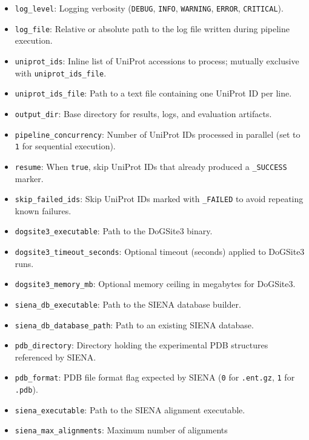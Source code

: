 \documentclass[11pt]{article}
\begin{document}
\begin{itemize}[noitemsep,leftmargin=*,labelsep=0.5em]
      \item \texttt{log\_level}: Logging verbosity (\texttt{DEBUG}, \texttt{INFO},
            \texttt{WARNING}, \texttt{ERROR}, \texttt{CRITICAL}).
      \item \texttt{log\_file}: Relative or absolute path to the log file written
            during pipeline execution.
      \item \texttt{uniprot\_ids}: Inline list of UniProt accessions to process;
            mutually exclusive with \texttt{uniprot\_ids\_file}.
      \item \texttt{uniprot\_ids\_file}: Path to a text file containing one
            UniProt ID per line.
      \item \texttt{output\_dir}: Base directory for results, logs, and
            evaluation artifacts.
      \item \texttt{pipeline\_concurrency}: Number of UniProt IDs processed in
            parallel (set to \texttt{1} for sequential execution).
      \item \texttt{resume}: When \texttt{true}, skip UniProt IDs that already
            produced a \texttt{\_SUCCESS} marker.
      \item \texttt{skip\_failed\_ids}: Skip UniProt IDs marked with
            \texttt{\_FAILED} to avoid repeating known failures.
      \item \texttt{dogsite3\_executable}: Path to the DoGSite3 binary.
      \item \texttt{dogsite3\_timeout\_seconds}: Optional timeout (seconds)
            applied to DoGSite3 runs.
      \item \texttt{dogsite3\_memory\_mb}: Optional memory ceiling in megabytes
            for DoGSite3.
      \item \texttt{siena\_db\_executable}: Path to the SIENA database builder.
      \item \texttt{siena\_db\_database\_path}: Path to an existing SIENA
            database.
      \item \texttt{pdb\_directory}: Directory holding the experimental PDB
            structures referenced by SIENA.
      \item \texttt{pdb\_format}: PDB file format flag expected by SIENA
            (\texttt{0} for \texttt{.ent.gz}, \texttt{1} for \texttt{.pdb}).
      \item \texttt{siena\_executable}: Path to the SIENA alignment executable.
      \item \texttt{siena\_max\_alignments}: Maximum number of alignments

\end{itemize}
\end{document}
